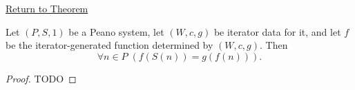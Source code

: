 \newpage
{}
\label{prf:iterator-successor-step}

\begin{remark*}[Return]
\hyperref[thm:iterator-successor-step]{Return to Theorem}
\end{remark*}

\begin{theorem*}
Let $(P,S,1)$ be a Peano system, let $(W,c,g)$ be iterator data for it, and let
$f$ be the iterator-generated function determined by $(W,c,g)$. Then
\[
\forall n\in P\;(f(S(n))=g(f(n))).
\]
\end{theorem*}

\begin{proof}
TODO
\end{proof}
